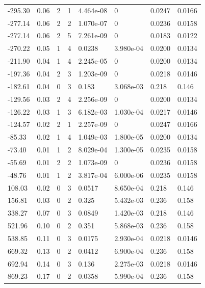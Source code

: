 \documentclass[preview]{standalone}
\begin{document}
{{\begin{tabular}{L{1.2cm}C{1.2cm} C{0.3cm}C{0.5cm} C{1.4cm}C{1.4cm} C{1.4cm}C{1.4cm}}
  -295.30  &  0.06  & 2     &  1 &  4.464e-08  & 0  & 0.0247 &  0.0166   \\ 
  -277.14  &  0.06  & 2     &  2 &  1.070e-07  & 0  & 0.0236 &  0.0158   \\ 
  -277.14  &  0.06  & 2     &  5 &  7.261e-09  & 0  & 0.0183 &  0.0122   \\ 
  -270.22  &  0.05  & 1     &  4 &  0.0238  & 3.980e-04  & 0.0200 &  0.0134   \\ 
  -211.90  &  0.04  & 1     &  4 &  2.245e-05  & 0  & 0.0200 &  0.0134   \\ 
  -197.36  &  0.04  & 2     &  3 &  1.203e-09  & 0  & 0.0218 &  0.0146   \\ 
  -182.61  &  0.04  & 0     &  3 &  0.183  & 3.068e-03  & 0.218 &  0.146   \\ 
  -129.56  &  0.03  & 2     &  4 &  2.256e-09  & 0  & 0.0200 &  0.0134   \\ 
  -126.22  &  0.03  & 1     &  3 &  6.182e-03  & 1.030e-04  & 0.0217 &  0.0146   \\ 
  -124.57  &  0.02  & 2     &  1 &  2.257e-09  & 0  & 0.0247 &  0.0166   \\ 
  -85.33  &  0.02  & 1     &  4 &  1.049e-03  & 1.800e-05  & 0.0200 &  0.0134   \\ 
  -73.40  &  0.01  & 1     &  2 &  8.029e-04  & 1.300e-05  & 0.0235 &  0.0158   \\ 
  -55.69  &  0.01  & 2     &  2 &  1.073e-09  & 0  & 0.0236 &  0.0158   \\ 
  -48.76  &  0.01  & 1     &  2 &  3.817e-04  & 6.000e-06  & 0.0235 &  0.0158   \\ 
  108.03  &  0.02  & 0     &  3 &  0.0517  & 8.650e-04  & 0.218 &  0.146   \\ 
  156.81  &  0.03  & 0     &  2 &  0.325  & 5.432e-03  & 0.236 &  0.158   \\ 
  338.27  &  0.07  & 0     &  3 &  0.0849  & 1.420e-03  & 0.218 &  0.146   \\ 
  521.96  &  0.10  & 0     &  2 &  0.351  & 5.868e-03  & 0.236 &  0.158   \\ 
  538.85  &  0.11  & 0     &  3 &  0.0175  & 2.930e-04  & 0.0218 &  0.0146   \\ 
  669.32  &  0.13  & 0     &  2 &  0.0412  & 6.900e-04  & 0.236 &  0.158   \\ 
  692.94  &  0.14  & 0     &  3 &  0.136  & 2.275e-03  & 0.0218 &  0.0146   \\ 
  869.23  &  0.17  & 0     &  2 &  0.0358  & 5.990e-04  & 0.236 &  0.158   \\ 

\end{tabular}}}
\end{document}
